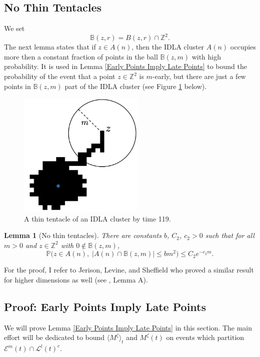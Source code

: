 \documentclass[11pt]{article}
\numberwithin{equation}{section}
\newtheorem{lemma}[theorem]{Lemma}
\begin{document}
\subsection{No Thin Tentacles}
\label{sec: no thin tentacles}
We set
\begin{equation}\label{D: mathbbB(z,r)}
  \nonumber
  \mathbb{B}(z, r) = B(z, r) \cap \mathbb{Z}^2.   
\end{equation}
The next lemma states that if $z \in A(n)$, then the IDLA 
cluster $A(n)$ occupies more then a 
constant fraction of points in the ball $\mathbb{B}(z,m)$ with high probability.  
It is used in Lemma \ref{Early Points Imply Late Points} 
to bound the probability of the event that 
a point $z \in \mathbb{Z}^2$ is $m$-early, but there are just a few 
points in $\mathbb{B}(z,m)$ part of the IDLA cluster (see Figure \ref{F: thin tentacle} below). 
\begin{figure}[H]
  \captionsetup{width=.9\linewidth}
  \centering
  \includegraphics[width=6cm, height=6cm]{thin_tentacle115.png}
  \caption{A thin tentacle of an IDLA cluster by time 119.}
  \label{F: thin tentacle}
\end{figure}
\begin{lemma}[No thin tentacles]
  \label{No Thin Tentacles}
  There are constants $b$, $C_2$, $c_2 > 0$
  such that for all $m>0$ and 
  $z \in \mathbb{Z}^2$ with $0 \notin \mathbb{B}(z,m)$, 
  \begin{equation}\nonumber
    \mathbb{P}\big( z \in A(n),\; 
    | A(n) \cap \mathbb{B}(z,m) | \leq b m ^2  \big) 
    \leq C_2 e^{-c_2 m}.
  \end{equation}  
\end{lemma}

For the proof, I refer to Jerison, Levine, and Sheffield
who proved a similar result for higher dimensions as well 
(see \cite{jerison}, Lemma A).


\subsection{Proof: Early Points Imply Late Points}
\label{sec: detect early points}
We will prove Lemma \ref{Early Points Imply Late Points} 
in this section. The main effort will be dedicated to bound 
$\langle M^{\zeta} \rangle_t$ and $M^{\zeta}(t)$ on events which 
partition $\mathcal{E}^m(t) \cap \mathcal{L}^l(t)^c$.
\end{document}
